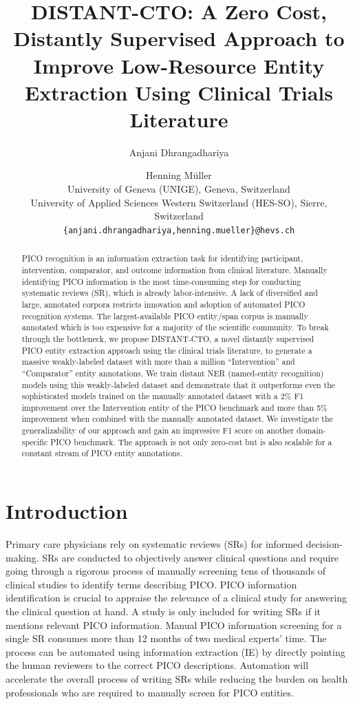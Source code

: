 \documentclass[11pt]{article}
\title{DISTANT-CTO: A Zero Cost, Distantly Supervised Approach to Improve Low-Resource Entity Extraction Using Clinical Trials Literature}
\author{Anjani Dhrangadhariya \and Henning M{\"u}ller\\
         University of Geneva (UNIGE), Geneva, Switzerland \\ University of Applied Sciences Western Switzerland (HES-SO), Sierre, Switzerland \\ \texttt{\{anjani.dhrangadhariya,henning.mueller\}@hevs.ch} }
\begin{document}
\maketitle
\begin{abstract}
PICO recognition is an information extraction task for identifying participant, intervention, comparator, and outcome information from clinical literature.
Manually identifying PICO information is the most time-consuming step for conducting systematic reviews (SR), which is already labor-intensive.
A lack of diversified and large, annotated corpora restricts innovation and adoption of automated PICO recognition systems.
The largest-available PICO entity/span corpus is manually annotated which is too expensive for a majority of the scientific community.
To break through the bottleneck, we propose DISTANT-CTO, a novel distantly supervised PICO entity extraction approach using the clinical trials literature, to generate a massive weakly-labeled dataset with more than a million ``Intervention'' and ``Comparator'' entity annotations.
We train distant NER (named-entity recognition) models using this weakly-labeled dataset and demonstrate that it outperforms even the sophisticated models trained on the manually annotated dataset with a 2\% F1 improvement over the Intervention entity of the PICO benchmark and more than 5\% improvement when combined with the manually annotated dataset.
We investigate the generalizability of our approach and gain an impressive F1 score on another domain-specific PICO benchmark.
The approach is not only zero-cost but is also scalable for a constant stream of PICO entity annotations.
\end{abstract}
%
\section{Introduction}
\label{sec:intro}
%
Primary care physicians rely on systematic reviews (SRs) for informed decision-making.
SRs are conducted to objectively answer clinical questions and require going through a rigorous process of manually screening tens of thousands of clinical studies to identify terms describing PICO.
PICO information identification is crucial to appraise the relevance of a clinical study for answering the clinical question at hand.
A study is only included for writing SRs if it mentions relevant PICO information.
Manual PICO information screening for a single SR consumes more than 12 months of two medical experts' time.
The process can be automated using information extraction (IE) by directly pointing the human reviewers to the correct PICO descriptions.
Automation will accelerate the overall process of writing SRs while reducing the burden on health professionals who are required to manually screen for PICO entities.
\end{document}
